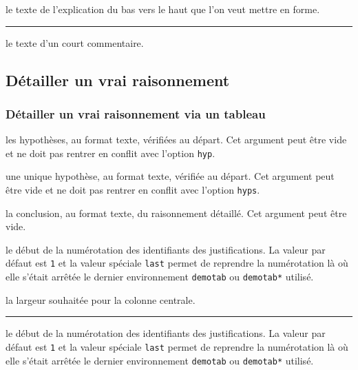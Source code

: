 \documentclass[12pt,a4paper]{article}
\theoremstyle{definition}
\newcommand\env[1]{\texttt{#1}}
\newcommand\separation{
    \medskip
    \hfill\rule{0.5\textwidth}{0.75pt}\hfill
    \medskip
}
\newcommand\extraspace{
    \vspace{0.25em}
}
\begin{document}
 le texte de l'explication du bas vers le haut que l'on veut mettre en forme.


\separation



\IDarg{} le texte d'un court commentaire.








\subsection{Détailler un \og vrai \fg{} raisonnement}



\subsubsection{Détailler un \og vrai \fg{} raisonnement via un tableau}


   les hypothèses, au format texte, vérifiées au départ.
               Cet argument peut être vide et ne doit pas rentrer en conflit avec l'option \verb+hyp+.

    une unique hypothèse, au format texte, vérifiée au départ.
               Cet argument peut être vide et ne doit pas rentrer en conflit avec l'option \verb+hyps+.

    la conclusion, au format texte, du raisonnement détaillé.
               Cet argument peut être vide.

\extraspace

  le début de la numérotation des identifiants des justifications.
               La valeur par défaut est \verb+1+ et la valeur spéciale \verb+last+ permet de reprendre la numérotation là où elle s'était arrêtée le dernier environnement \env{demotab} ou \env{demotab*} utilisé.

 la largeur souhaitée pour la colonne centrale.



\separation



 le début de la numérotation des identifiants des justifications.
              La valeur par défaut est \verb+1+ et la valeur spéciale \verb+last+ permet de reprendre la numérotation là où elle s'était arrêtée le dernier environnement \env{demotab} ou \env{demotab*} utilisé.
\end{document}
